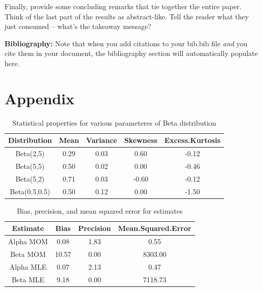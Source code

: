 \documentclass{article}\usepackage[]{graphicx}\usepackage[]{xcolor}
\begin{document}
\begin{multicols}{2}
Finally, provide some concluding remarks that tie together the entire paper. Think of the last part of the results as abstract-like. Tell the reader what they just consumed -- what's the takeaway message?

\vspace{2em}

\noindent\textbf{Bibliography:} Note that when you add citations to your bib.bib file \emph{and}
you cite them in your document, the bibliography section will automatically populate here.

\begin{tiny}

\end{tiny}
\end{multicols}

\newpage
\onecolumn
\section{Appendix}

\begin{table}[ht]
\centering
\begin{tabular}{|c|c|c|c|c|}
  \hline
Distribution & Mean & Variance & Skewness & Excess.Kurtosis \\ 
  \hline
Beta(2,5) & 0.29 & 0.03 & 0.60 & -0.12 \\ 
  Beta(5,5) & 0.50 & 0.02 & 0.00 & -0.46 \\ 
  Beta(5,2) & 0.71 & 0.03 & -0.60 & -0.12 \\ 
  Beta(0.5,0.5) & 0.50 & 0.12 & 0.00 & -1.50 \\ 
   \hline
\end{tabular}
\caption{Statistical properties for various parameteres of Beta distribution} 
\label{statsProperties.tab}
\end{table}


\begin{table}[ht]
\centering
\begin{tabular}{|c|c|c|c|}
  \hline
Estimate & Bias & Precision & Mean.Squared.Error \\ 
  \hline
Alpha MOM & 0.08 & 1.83 & 0.55 \\ 
  Beta MOM & 10.57 & 0.00 & 8303.00 \\ 
  Alpha MLE & 0.07 & 2.13 & 0.47 \\ 
  Beta MLE & 9.18 & 0.00 & 7118.73 \\ 
   \hline
\end{tabular}
\caption{Bias, precision, and mean squared error for estimates} 
\label{precision.tab}
\end{table}
\end{document}
